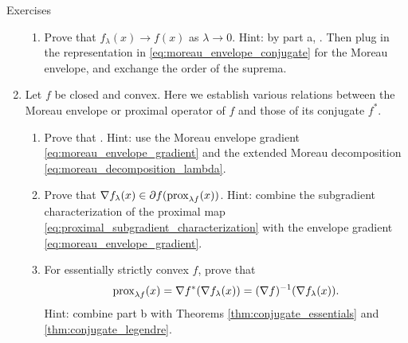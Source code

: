 \begin{xcb}{Exercises}
\begin{enumerate}[label=\thechapter.\arabic*]
\begin{enumerate}[label=\alph*.]
\item Prove that $f_\lambda(x) \to f(x)$ as $\lambda \to 0$. Hint: by part a, 
  . Then plug in the representation in
  \eqref{eq:moreau_envelope_conjugate} for the Moreau envelope, and exchange the 
  order of the suprema.   
\end{enumerate}

\item Let $f$ be closed and convex. Here we establish various relations between
  the Moreau envelope or proximal operator of $f$ and those of its conjugate
  $f^*$. 

\begin{enumerate}[label=\alph*.]
\item Prove that . Hint: use the Moreau envelope gradient
\eqref{eq:moreau_envelope_gradient} and the extended Moreau decomposition
\eqref{eq:moreau_decomposition_lambda}.   

\item Prove that $\nabla f_\lambda(x) \in \partial f (\operatorname{prox}_{\lambda
    f}(x))$. Hint: combine the subgradient characterization of the proximal map
  \eqref{eq:proximal_subgradient_characterization} with the envelope gradient 
  \eqref{eq:moreau_envelope_gradient}.  

\item For essentially strictly convex $f$, prove that 
  \[
  \operatorname{prox}_{\lambda  f}(x) = \nabla f^*(\nabla f_\lambda(x)) = (\nabla f)^{-1}
  (\nabla f_\lambda(x)).
  \]
  Hint: combine part b with Theorems \ref{thm:conjugate_essentials} and
  \ref{thm:conjugate_legendre}. 
\end{enumerate}
\end{enumerate}
\end{xcb}
